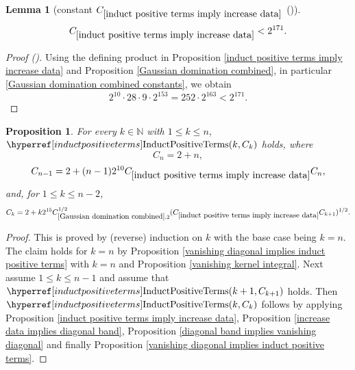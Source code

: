 \documentclass[12pt,reqno]{amsart}
\newcommand{\auto}{{({\tiny\faCar})}}
\theoremstyle{plain}
\newtheorem{lemma}[theorem]{Lemma}
\newtheorem{proposition}[theorem]{Proposition}
\numberwithin{equation}{section}
\theoremstyle{remark}
\newcommand{\uses}[1]{}
\newcommand{\usesdefs}[1]{}
\newcommand{\N}{{\mathbb N}}
\begin{document}
\begin{lemma}[constant $C_{\ref{induct positive terms imply increase data}}$ \auto]\label{constant induct positive terms imply increase data}\uses{Gaussian domination combined,induct positive terms imply increase data}\usesdefs{}
\begin{equation}\label{constant induct positive terms imply increase data bound}
C_{\ref{induct positive terms imply increase data}}<2^{171}.
\end{equation}
\end{lemma}
\begin{proof}[Proof \auto]
Using the defining product in Proposition \ref{induct positive terms imply increase data} and Proposition \ref{Gaussian domination combined}, in particular \eqref{Gaussian domination combined constants}, we obtain
\[
2^{10}\cdot28\cdot9\cdot2^{153}
=252\cdot2^{163}<2^{171}.
\]
\end{proof}


\begin{proposition}\label{P:C_k-induction}\uses{vanishing diagonal implies induct positive terms,vanishing kernel integral,induct positive terms imply increase data,increase data implies diagonal band,diagonal band implies vanishing diagonal}\usesdefs{induct positive terms}
For every $k\in\N$ with $1\le k\le n$, $\InductPositiveTerms{k,C_k}$ holds, where
\begin{equation}\label{auto:positive-induction-recursion}
C_n=2+n,
\end{equation}
\begin{equation}\label{auto:positive-induction-recursion-terminal-step}
C_{n-1}=2+(n-1)2^{10}C_{\ref{induct positive terms imply increase data}}C_n,
\end{equation}
and, for $1\le k\le n-2$,
\begin{equation}\label{auto:positive-induction-recursion-interior-step}
C_k=2+k2^{15}C_{\ref{Gaussian domination combined},2}^{1/2}
(C_{\ref{induct positive terms imply increase data}}C_{k+1})^{1/2}.
\end{equation}
\end{proposition}

\begin{proof}
This is proved by (reverse) induction on $k$ with the base case being $k=n$.
The claim holds for $k=n$ by Proposition \ref{vanishing diagonal implies induct positive terms} with $k=n$ and Proposition \ref{vanishing kernel integral}.
Next assume $1\le k\le n-1$ and assume that $\InductPositiveTerms{k+1,C_{k+1}}$ holds.
Then $\InductPositiveTerms{k,C_k}$
follows by applying Proposition \ref{induct positive terms imply increase data}, Proposition \ref{increase data implies diagonal band}, Proposition \ref{diagonal band implies vanishing diagonal} and finally Proposition \ref{vanishing diagonal implies induct positive terms}.
\end{proof}
\end{document}

